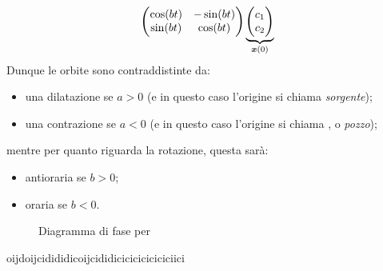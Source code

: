 {\[{            \begin{pmatrix}
                \cos(bt) & -\sin(bt)\\ 
            \sin(bt) & \cos(bt)
            \end{pmatrix}
        }\,\underset{\bm{x}(0)}{\underbrace{\begin{pmatrix}
            c_1\\c_2
        \end{pmatrix}}}
    \]Dunque le orbite sono contraddistinte da: 
    \begin{itemize}
        \item una dilatazione se $ a>0 $ (e in questo caso l'origine si chiama \emph{sorgente});
        \item una contrazione se $ a<0 $ (e in questo caso l'origine si chiama , o \emph{pozzo});
    \end{itemize}mentre per quanto riguarda la rotazione, questa sarà: \begin{itemize}
        \item antioraria se $ b>0 $;
        \item oraria se $ b<0 $.
    \end{itemize}
    \begin{figure}[H]
        \caption{Diagramma di fase per }
    \end{figure}
}{oijdoijcidididicoijcididiciciciciciciciici}{}
